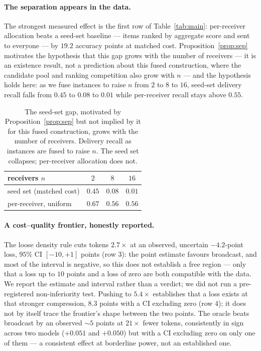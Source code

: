\documentclass[sigconf,anonymous]{aamas}
\theoremstyle{remark}
\begin{document}
\paragraph{The separation appears in the data.} The strongest measured
effect is the first row of Table~\ref{tab:main}: per-receiver
allocation beats a seed-set baseline --- items ranked by aggregate
score and sent to everyone --- by $19.2$ accuracy points at matched
cost. Proposition~\ref{prop:sep} motivates the hypothesis that this gap
grows with the number of receivers --- it is an existence result, not
a prediction about this fused construction, where the candidate pool
and ranking competition also grow with $n$ --- and the hypothesis
holds here: as we fuse instances to raise $n$ from $2$ to $8$ to $16$,
seed-set delivery recall falls from $0.45$ to $0.08$ to $0.01$ while
per-receiver recall stays above $0.55$.

\begin{table}[t]
\centering
\caption{The seed-set gap, motivated by Proposition~\ref{prop:sep} but
not implied by it for this fused construction, grows with the number
of receivers. Delivery recall as instances are fused to raise $n$. The
seed set collapses; per-receiver allocation does not.}
\label{tab:scaling}
\begin{tabular}{lccc}
\toprule
receivers $n$ & $2$ & $8$ & $16$ \\
\midrule
seed set (matched cost)   & $0.45$ & $0.08$ & $0.01$ \\
per-receiver, uniform     & $0.67$ & $0.56$ & $0.56$ \\
\bottomrule
\end{tabular}
\end{table}

\paragraph{A cost--quality frontier, honestly reported.} The loose
density rule cuts tokens $2.7\times$ at an observed, uncertain
$-4.2$-point loss, $95\%$ CI $[-10,+1]$ points (row 3): the point
estimate favours broadcast, and most of the interval is negative, so
this does not establish a free region --- only that a loss up to $10$
points and a loss of zero are both compatible with the data. We report
the estimate and interval rather than a verdict; we did not run a
pre-registered non-inferiority test. Pushing to $5.4\times$ establishes
that a loss exists at that stronger compression, $8.3$ points with a
CI excluding zero (row 4); it does not by itself trace the frontier's
shape between the two points. The oracle beats broadcast by an observed $\sim5$
points at $21\times$ fewer tokens, consistently in sign across two
models ($+0.051$ and $+0.050$) but with a CI excluding zero on only
one of them --- a consistent effect at borderline power, not an
established one.
\end{document}
